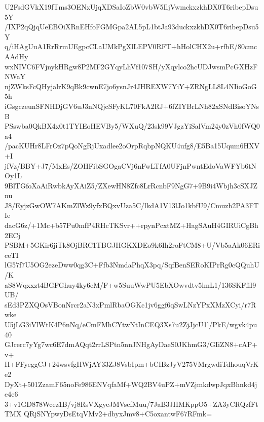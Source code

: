 U2FsdGVkX19fTms3OENxUjqXDSaIoZbW0vbW5IljVwmckxzkhDX0T6ribepDsu5Y
/IXP2qQjqUeEBOiXRnEHfoFGMGpa2AL5pL1btJa93duckxzkhDX0T6ribepDsu5Y
q/iHAgUuA1RrRrmUEgpcCLaUMkPgXlLEPV0RFT+hHolCHX2u+rfbE/80cmcAAdHy
wxNIVC6FVjnykHRgw8P2MF2GYqyLhVf107SH/yXqylco2hcUDJwsmPcGXHzFNWaY
njZWksFcQHyjalrK9qBk9cwnE7jo6ysnJr4JHREXW7YiY+ZRNgLL8L4NIioGoG5h
iGsgczeunSFNHDjGV6uJ3nNQjcSFyKL70FkA2RJ+6fZIYBrLNh82xSNdBisoYNsB
PSswba0QkBX4x0t1TYIEoHEVBy5/WXuQ/23sk99VJgzYiSalVm24y0zVh0fWQ0a4
/pacKUHr8LFrOz7pQoNgRjUxadlee2oOrpRqbpNQKU4ufg8/E5Ba15Uqum6HXV+I
jfVz/BBY+J7/MxEs/ZOHFibSGOgaCVj6nFwLTfA0UFjnPwntEdoVaWFYb6tNOy1L
9BlTGfoXaAiRwbkAyXAiZ5/ZXewHN8Zfc8LrRcnbF9NgG7+9B9i4Wbjh3cSXJZnu
J8/EyjzGwOW7AKmZlWz9yfxBQxvUza5C/lkdA1V13lJo1kbfU9/Cmuzb2PA3FTIe
dacG6z/+1Mc+b57Pu0mfP4RHcTKSvr++rpynPcxtMZ+HagSAuH4GIRUiCgBh2ECj
PSBM+5GKir6jiTk8OjBRC1TBGJHGKXDEo9k6Ih2roFtCM8+U/Vb5aAk06ERiceTI
lG57f7U5OG2ezeDww0qg3C+Ffb3NmdaPhqX3pq/SqfBenSERoKIPrRg0cQQuhU/K
aS8Wqxxzt4BGFGhuy4ky6eM/F+w5SuuWwPU5EbXOwvdtv5lmL1/136SKFfiI9UB/
sEd3PZXQOsVBonNrcr2aN3xPmlRbaOGKc1jv6ggf6qSwLNzYPxXMzXCyi/r7Rwke
U5jLG3iVlWtK4P6nNq/eCmFMhCYtwNtInCEQ3Xs7u2ZjJjcU1l/PkE/wgvk4pu40
GJrerc7yYg7wc6E7dmAQqt2rrLSPtn5nnJNHgAyDaeS0JKhmG3/GIiZN8+cAP+v+
H+FFyeggCJ+24wsvfgHWjAY33ZJ8VsbIpm+bCIBzJyV275VMrgwdiTdhouqVrKe2
DyXt+501ZzamF65noFe986ENVqfaMf+WQ2BV4uPZ+mVZjmkdwpJqxBhnkd4je4e6
3+v1GD878Wcez1B/vj8RsVXgyeJMVscfMuu/7JaB3JHMKppO5+ZA3yCRQzfFtTMX
QRjSNYpwyDsEtqVMv2+dbyxJmv8+C5oxantwF67RFmk=

